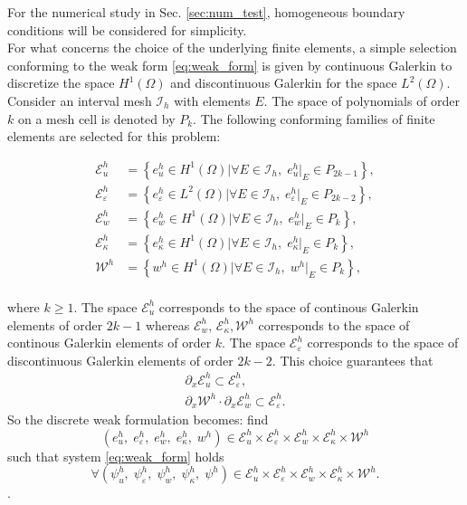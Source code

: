 \documentclass{ifacconf}
\begin{document}
 For the numerical study in Sec. \ref{sec:num_test}, homogeneous boundary conditions will be considered for simplicity. \\

For what concerns the choice of the underlying finite elements, a simple selection conforming to the weak form \eqref{eq:weak_form} is given by continuous Galerkin to discretize the space $H^1(\Omega)$ and discontinuous Galerkin for the space $L^2(\Omega)$. Consider an interval mesh $\mathcal{I}_h$ with elements $E$. The space of polynomials of order $k$ on a mesh cell is denoted by $P_k$. The following conforming families of finite elements are selected for this problem:

\begin{equation}\label{eq:FE}
	\begin{aligned}
		\mathcal{E}^h_u &= \left\{e_u^h \in H^1(\Omega)\vert \forall E \in \mathcal{I}_h, \; e_u^h\vert_E \in P_{2k-1} \right\}, \\
		\mathcal{E}^h_\varepsilon &= \left\{e_\varepsilon^h \in L^2(\Omega)\vert \forall E \in \mathcal{I}_h, \; e_\varepsilon^h\vert_E \in P_{2k-2} \right\}, \\
		\mathcal{E}^h_w &= \left\{e_w^h \in H^1(\Omega)\vert \forall E \in \mathcal{I}_h, \; e_w^h\vert_E \in P_{k} \right\}, \\
		\mathcal{E}^h_\kappa &= \left\{e_\kappa^h \in H^1(\Omega)\vert \forall E \in \mathcal{I}_h, \; e_\kappa^h\vert_E \in P_{k} \right\}, \\
		\mathcal{W}^h &= \left\{w^h \in H^1(\Omega)\vert \forall E \in \mathcal{I}_h, \; w^h\vert_E \in P_{k} \right\}, \\
	\end{aligned}
\end{equation}

where $k \ge 1$. The space $\mathcal{E}^h_u$ corresponds to the space of continous Galerkin elements of order $2k-1$ whereas $\mathcal{E}^h_w, \, \mathcal{E}^h_\kappa, \mathcal{W}^h$ corresponds to the space of continous Galerkin elements of order $k$. The space $\mathcal{E}^h_\varepsilon$ corresponds to the space of discontinuous Galerkin elements of order $2k-2$. This choice guarantees that 
\begin{equation}
\begin{aligned}
	\partial_x \mathcal{E}^h_u \subset \mathcal{E}^h_\varepsilon, \\
	\partial_x \mathcal{W}^h \cdot  \partial_x \mathcal{E}^h_w \subset \mathcal{E}^h_\varepsilon.
\end{aligned}
\end{equation}
So the discrete weak formulation becomes: find 
$$(e_u^h, \; e_\varepsilon^h, \; e_w^h, \; e_\kappa^h, \; w^h) \in   \mathcal{E}^h_u \times \mathcal{E}^h_\varepsilon \times \mathcal{E}^h_w \times \mathcal{E}^h_\kappa \times \mathcal{W}^h$$
such that system \eqref{eq:weak_form} holds 
$$\forall (\psi_u^h, \; \psi_\varepsilon^h, \;  \psi_w^h, \; \psi_\kappa^h, \; \psi^h) \in \mathcal{E}^h_u \times \mathcal{E}^h_\varepsilon \times \mathcal{E}^h_w \times \mathcal{E}^h_\kappa \times \mathcal{W}^h.$$.
\end{document}
